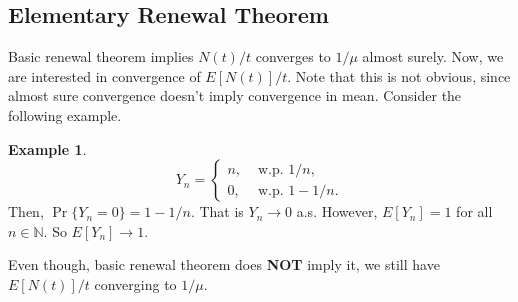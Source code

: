\documentclass[a4paper,10pt]{article}
\theoremstyle{plain}
\theoremstyle{definition}
\newtheorem{exmp}[thm]{Example}
\begin{document}
\subsection{Elementary Renewal Theorem}
Basic renewal theorem implies $N(t)/t$ converges to $1/\mu$ almost surely. Now, we are interested in convergence of $E[N(t)]/t$. Note that this is not obvious, since almost sure convergence doesn't imply convergence in mean. Consider the following example.
\begin{exmp}
\begin{equation*}
Y_n = \begin{cases}
n, & \mbox{ w.p.  } 1/n,\\
0, & \mbox{ w.p.  } 1- 1/n.
\end{cases}
\end{equation*}
Then, $\Pr\{ Y_n = 0 \} = 1 - 1/n$. %
That is $Y_n \to 0$ a.s. However, $E[Y_n] = 1$ for all $n \in \mathbb{N}$. So $E[Y_n] \to 1$.
\end{exmp}
Even though, basic renewal theorem does \textbf{NOT} imply it, we still have $E[N(t)]/t$ converging to $1/\mu$.
\end{document}
